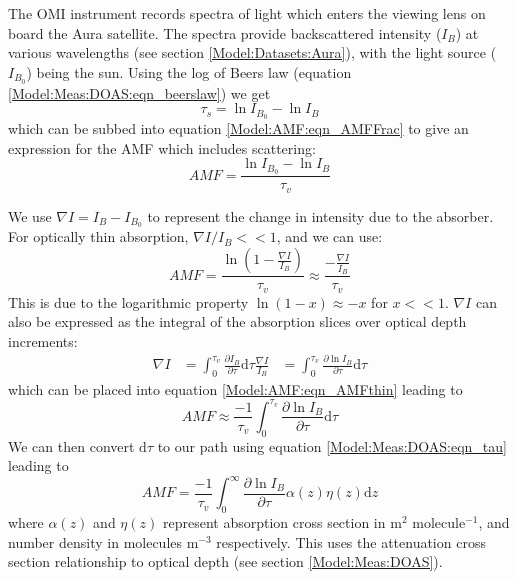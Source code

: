   
  The OMI instrument records spectra of light which enters the viewing lens on board the Aura satellite.
  The spectra provide backscattered intensity ($I_B$) at various wavelengths (see section \ref{Model:Datasets:Aura}), with the light source ($I_{B_0}$) being the sun. 
  Using the log of Beers law (equation \ref{Model:Meas:DOAS:eqn_beerslaw}) we get 
  $$ \tau_s = \ln{I_{B_0}} - \ln{I_B} $$
  which can be subbed into equation \ref{Model:AMF:eqn_AMFFrac} to give an expression for the AMF which includes scattering:
  \begin{equation} \label{Model:AMF:eqn_amfscattering}
    AMF = \frac{\ln{I_{B_0}}-\ln{I_B}}{\tau_v}
  \end{equation}
  
  We use $\nabla I = I_B - I_{B_0}$ to represent the change in intensity due to the absorber. 
  For optically thin absorption, $\nabla I / I_B << 1$, and we can use:
  \begin{equation} \label{Model:AMF:eqn_AMFthin}
    AMF = \frac{\ln{ \left( 1 - \frac{\nabla I}{I_B} \right)} }{\tau_v} \approx \frac{ - \frac{\nabla I}{I_B} }{\tau_v}
  \end{equation}
  This is due to the logarithmic property $\ln \left(1-x \right) \approx -x$ for $x<<1$.
  $\nabla I$ can also be expressed as the integral of the absorption slices over optical depth increments: 
  \begin{eqnarray*}
    \nabla I &= \int_0^{\tau_v}{\frac{\partial I_B}{\partial \tau} \mathrm{d}\tau}
    \frac{\nabla I}{I_B} & = \int_0^{\tau_v}{\frac{\partial \ln{I_B}}{\partial \tau} \mathrm{d}\tau}
  \end{eqnarray*}
  which can be placed into equation \ref{Model:AMF:eqn_AMFthin} leading to
  \begin{equation*}
    AMF \approx \frac{-1}{\tau_v} \int_0^{\tau_v}{\frac{\partial \ln{I_B}}{\partial \tau} \mathrm{d}\tau}
  \end{equation*}
  We can then convert $\text{d}\tau$ to our path using equation \ref{Model:Meas:DOAS:eqn_tau} leading to
  \begin{equation} \label{Model:AMF:eqn_AMFcross}
    AMF = \frac{-1}{\tau_v} \int_0^\infty {\frac{\partial \ln{I_B}}{\partial \tau} \alpha(z)\eta(z)\mathrm{d}z}
  \end{equation}
  where $\alpha(z)$ and $\eta(z)$ represent absorption cross section in m$^2$ molecule$^{-1}$, and number density in molecules m$^{-3}$ respectively. 
  This uses the attenuation cross section relationship to optical depth (see section \ref{Model:Meas:DOAS}).
  
